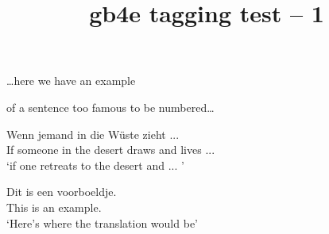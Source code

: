 \documentclass{article}
\title{gb4e tagging test -- 1}
\begin{document}
\ldots here we have an example
\begin{exe}
\end{exe}
of a sentence too famous to be numbered\ldots

\begin{exe}
\ex
\gll Wenn jemand in die W\"uste zieht ... \\
If someone in the desert draws and lives ... \\
\trans `if one retreats to the desert and ... '
\end{exe}


\begin{exe}
\ex
\gll * Dit is een voorboeldje.\\
{} This is an example.\\
\trans `Here's where the translation would be'

\end{exe}

\begin{exe}
\ex{}
\end{exe}
\end{document}
